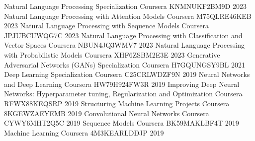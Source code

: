 \begin{cvhonors}
\cvhonor
    {Natural Language Processing Specialization}
    {Coursera}
    {KNMNUKF2BM9D}
    {2023}
\cvhonor
    {Natural Language Processing with Attention Models}
    {Coursera}
    {M75QLRE46KEB}
    {2023}
\cvhonor
    {Natural Language Processing with Sequence Models}
    {Coursera}
    {JPJUBCUWQG7C}
    {2023}
\cvhonor
    {Natural Language Processing with Classification and Vector Spaces}
    {Coursera}
    {NBUN4JQ3WMV7}
    {2023}
\cvhonor
    {Natural Language Processing with Probabilistic Models}
    {Coursera}
    {XHF6ZSBM2E3E}
    {2023}
\cvhonor
    {Generative Adversarial Networks (GANs) Specialization}
    {Coursera}
    {H7GQUNGSY9BL}
    {2021}
\cvhonor
    {Deep Learning Specialization}
    {Coursera}
    {C25CRLWDZF9N}
    {2019}
\cvhonor
    {Neural Networks and Deep Learning}
    {Coursera}
    {HW79H924FW3R}
    {2019}
\cvhonor
    {Improving Deep Neural Networks: Hyperparameter tuning, Regularization and Optimization}
    {Coursera}
    {RFWX88KEQSRP}
    {2019}
\cvhonor
    {Structuring Machine Learning Projects}
    {Coursera}
    {8KGEWZAEYEMB}
    {2019}
\cvhonor
    {Convolutional Neural Networks}
    {Coursera}
    {CYWY6MHT2Q5C}
    {2019}
\cvhonor
    {Sequence Models}
    {Coursera}
    {BK59MAKLBF4T}
    {2019}
\cvhonor
    {Machine Learning}
    {Coursera}
    {4M3KEARLDDJP}
    {2019}
\end{cvhonors}
